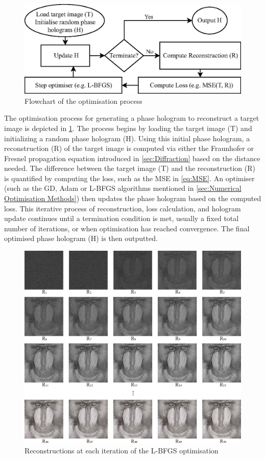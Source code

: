 \begin{figure}[H]
	\centering
	\includegraphics[width=\textwidth]{optim_flowchart_2D.eps}
	\caption{Flowchart of the optimisation process}
	\label{fig:optim_flowchart_2D}
\end{figure}

The optimisation process for generating a phase hologram to reconstruct a target image is depicted in \cref{fig:optim_flowchart_2D}. The process begins by loading the target image (T) and initializing a random phase hologram (H). Using this initial phase hologram, a reconstruction (R) of the target image is computed via either the Fraunhofer or Fresnel propagation equation introduced in \cref{sec:Diffraction} based on the distance needed. The difference between the target image (T) and the reconstruction (R) is quantified by computing the loss, such as the MSE in \cref{eq:MSE}. An optimiser (such as the GD, Adam or L-BFGS algorithms mentioned in \cref{sec:Numerical Optimisation Methods}) then updates the phase hologram based on the computed loss. This iterative process of reconstruction, loss calculation, and hologram update continues until a termination condition is met, usually a fixed total number of iterations, or when optimisation has reached convergence. The final optimised phase hologram (H) is then outputted.

\begin{figure}[H]
	\centering
	\includegraphics[width=\textwidth]{LBFGS_iters.pdf}
	\caption{Reconstructions at each iteration of the L-BFGS optimisation}
	\label{fig:LBFGS_iters}
\end{figure}

